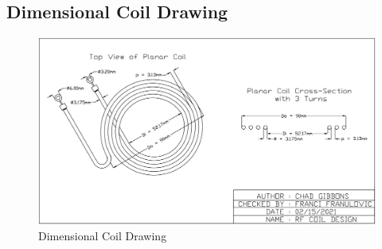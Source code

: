 \documentclass[12pt]{article}
\begin{document}
\begin{appendices}
%
\pagebreak

\pagebreak

\pagebreak

\pagebreak

\pagebreak

\pagebreak
\section{Dimensional Coil Drawing}
\hfill
\begin{figure}[h!]
\centering
\includegraphics[angle=90,width=0.70\linewidth]{Coil_CAD}
\caption{Dimensional Coil Drawing}
\end{figure}
\hfill
\pagebreak

\end{appendices}
\end{document}
